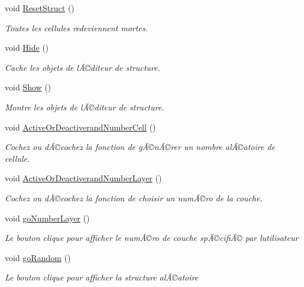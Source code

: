 \begin{DoxyCompactItemize}
void \mbox{\hyperlink{class_edit_mode_manager_afc8be75da1a5042fcf78b0e9bf1e2108}{Reset\+Struct}} ()
\begin{DoxyCompactList}\small\item\em Toutes les cellules redeviennent mortes. \end{DoxyCompactList}\item 
void \mbox{\hyperlink{class_edit_mode_manager_aacc30d9cdb3d747fbad20130903ec24e}{Hide}} ()
\begin{DoxyCompactList}\small\item\em Cache les objets de l\textquotesingle{}Ã©diteur de structure. \end{DoxyCompactList}\item 
void \mbox{\hyperlink{class_edit_mode_manager_acf80baac30f6611bcb1bf97b61ffc1ca}{Show}} ()
\begin{DoxyCompactList}\small\item\em Montre les objets de l\textquotesingle{}Ã©diteur de structure. \end{DoxyCompactList}\item 
void \mbox{\hyperlink{class_edit_mode_manager_ac9e73b653a4af1d833a2df57c45cf4cf}{Active\+Or\+Deactiverand\+Number\+Cell}} ()
\begin{DoxyCompactList}\small\item\em Cochez ou dÃ©cochez la fonction de gÃ©nÃ©rer un nombre alÃ©atoire de cellule. \end{DoxyCompactList}\item 
void \mbox{\hyperlink{class_edit_mode_manager_ab1048ff448edf1c84b42abb9a811d0ae}{Active\+Or\+Deactiverand\+Number\+Layer}} ()
\begin{DoxyCompactList}\small\item\em Cochez ou dÃ©cochez la fonction de choisir un numÃ©ro de la couche. \end{DoxyCompactList}\item 
void \mbox{\hyperlink{class_edit_mode_manager_ac7d44060ec1a703a7f9ea15ecf13d2cf}{go\+Number\+Layer}} ()
\begin{DoxyCompactList}\small\item\em Le bouton clique pour afficher le numÃ©ro de couche spÃ©cifiÃ© par l\textquotesingle{}utilisateur \end{DoxyCompactList}\item 
void \mbox{\hyperlink{class_edit_mode_manager_a96ee789fb9bf31726bf942d334775a92}{go\+Random}} ()
\begin{DoxyCompactList}\small\item\em Le bouton clique pour afficher la structure alÃ©atoire \end{DoxyCompactList}\item 

\end{DoxyCompactItemize}
